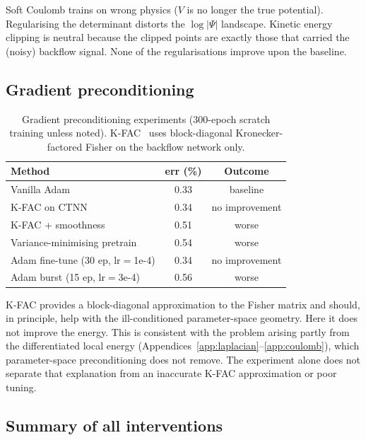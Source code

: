 Soft Coulomb trains on wrong physics ($V$ is no longer the true potential).
Regularising the determinant distorts the $\log|\Psi|$ landscape.
Kinetic energy clipping is neutral because the clipped points are exactly
those that carried the (noisy) backflow signal.
None of the regularisations improve upon the baseline.

\subsection{Gradient preconditioning}
\label{app:catch22:precondition}

\begin{table}[htbp]
\centering
\caption[Gradient preconditioning experiments]{Gradient preconditioning experiments (300-epoch scratch training
unless noted). K-FAC~\cite{MartensGrosse2015-KFAC} uses block-diagonal Kronecker-factored
Fisher on the backflow network only.}
\label{tab:c22:kfac}
\begin{tabular}{l c c}
\toprule
Method & err (\%) & Outcome \\
\midrule
Vanilla Adam & 0.33 & baseline \\
K-FAC on CTNN & 0.34 & no improvement \\
K-FAC + smoothness & 0.51 & worse \\
Variance-minimising pretrain & 0.54 & worse \\
Adam fine-tune (30 ep, lr$=$1e-4) & 0.34 & no improvement \\
Adam burst (15 ep, lr$=$3e-4) & 0.56 & worse \\
\bottomrule
\end{tabular}
\end{table}

K-FAC provides a block-diagonal approximation to the Fisher matrix
and should, in principle, help with the ill-conditioned parameter-space
geometry.
Here it does not improve the energy. This is consistent with the problem arising partly
from the differentiated local energy (Appendices~\ref{app:laplacian}--\ref{app:coulomb}),
which parameter-space preconditioning does not remove. The experiment alone does not
separate that explanation from an inaccurate K-FAC approximation or poor tuning.

\subsection{Summary of all interventions}
\label{app:catch22:summary}

